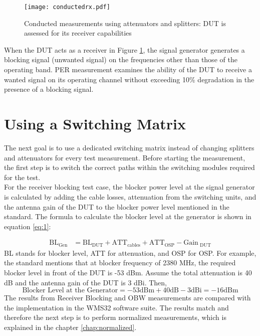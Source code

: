 \begin{figure}[H]
\centering
   \texttt{[image: conductedrx.pdf]}
 \vspace{-1.2cm} \caption{Conducted measurements using attenuators and splitters: \acs{DUT} is assessed for its receiver capabilities}
   \label{fig:Ng2}
\end{figure}

When the \acs{DUT} acts as a receiver in Figure \ref{fig:Ng2}, the signal generator generates a blocking signal (unwanted signal) on the frequencies other than those of the operating band.  \acf{PER} measurement examines the ability of the \acs{DUT} to receive a wanted signal on its operating channel without exceeding 10\% degradation in the presence of a blocking signal. 

\section{Using a Switching Matrix}
\label{sec:switch}
The next goal is to use a dedicated switching matrix instead of changing splitters and attenuators for every test measurement. Before starting the measurement, the first step is to switch the correct paths within the switching modules required for the test. \\

For the receiver blocking test case, the blocker power level at the signal generator is calculated by adding the cable losses, attenuation from the switching units, and the antenna gain of the \acs{DUT} to the blocker power level mentioned in the standard. The formula to calculate the blocker level at the generator is shown in equation \ref{eq:1}:

\begin{equation}
\begin{aligned}
\mbox{BL}_ {\mbox{Gen}}  &= \mbox{BL}_ {\mbox{DUT}} + \mbox{ATT}_{\mbox{cables}} 
+ \mbox{ATT}_{\mbox{OSP}}  - \mbox{Gain}_{\mbox{ DUT}}
\label{eq:1}
\end{aligned}
\end{equation}
BL stands for blocker level, ATT for attenuation, and OSP for \acf{OSP}. For example, the standard mentions that at blocker frequency of 2380 MHz, the required blocker level in front of the \acs{DUT} is -53 dBm. Assume the total attenuation is 40 dB and the antenna gain of the \acs{DUT} is 3 dBi. Then,
$$\mbox{Blocker Level at the Generator} = -53 \mbox{dBm} + 40 \mbox{dB}- 3 \mbox{dBi} = -16 \mbox{dBm}$$ 
The results from Receiver Blocking and \acf{OBW} measurements are compared with the implementation in the WMS32 software suite. The results match and therefore the next step is to perform normalized measurements, which is explained in the chapter \ref{chap:normalized}.






